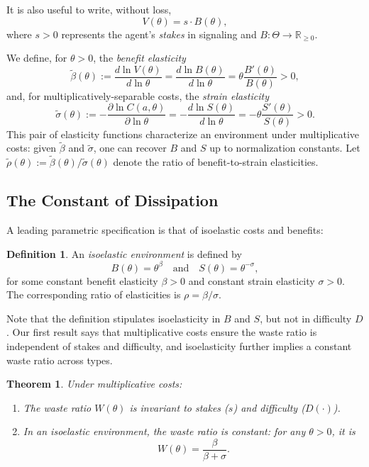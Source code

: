 \documentclass[12 pt]{article}
\newtheorem{theorem}{Theorem}
\theoremstyle{remark}
\theoremstyle{definition}
\newtheorem{definition}{Definition}
\newcommand{\R}{\mathbb{R}}
\newcommand{\Rpos}{\R_{\geq0}}
\newcommand{\elaB}{\tilde\beta}   %
\newcommand{\elaS}{\tilde\sigma}  %
\newcommand{\elaR}{\tilde\rho}    %
\begin{document}
It is also useful to write, without loss, $$V(\theta)= s\cdot B(\theta),$$ where $s>0$ represents the agent's \emph{stakes} in signaling and $B:\Theta\to \Rpos$.


We define, for $\theta>0$, the \emph{benefit elasticity}
\[
\elaB(\theta) := \frac{d\ln V(\theta)}{d\ln\theta} = \frac{d\ln B(\theta)}{d\ln\theta} = \theta\frac{B'(\theta)}{B(\theta)}>0,
\]
and, for multiplicatively-separable costs, the \emph{strain elasticity} %
\[
\elaS(\theta) := -\frac{\partial\ln C(a,\theta)}{\partial\ln\theta} = -\frac{d\ln S(\theta)}{d\ln\theta} = -\theta\frac{S'(\theta)}{S(\theta)}>0.
\]
This pair of elasticity functions characterize an environment under multiplicative costs: given $\elaB$ and $\elaS$, one can recover $B$ and $S$ up to normalization constants. 
Let $\elaR(\theta):=\elaB(\theta)/\elaS(\theta)$ denote the ratio of benefit-to-strain elasticities.


\subsection{The Constant of Dissipation}
\label{subsec:constant}

A leading parametric specification is that of isoelastic costs and benefits:

\begin{definition}
\label{def:isoelastic}
An \emph{isoelastic environment} is defined by
\[
B(\theta) = \theta^\beta \quad \text{and} \quad S(\theta) = \theta^{-\sigma},
\]
for some %
constant {benefit elasticity} $\beta > 0$ and constant {strain elasticity} $\sigma > 0$. The corresponding ratio of elasticities is $\rho = \beta / \sigma$.
\end{definition}

Note that the definition stipulates isoelasticity in $B$ and $S$, but not in difficulty $D$. Our first result says that multiplicative costs ensure the waste ratio is independent of stakes and difficulty, and isoelasticity further implies a constant waste ratio across types.


\begin{theorem}
\label{thm:constant}
Under multiplicative costs:
\begin{enumerate}
\item \label{invariance} The waste ratio $W(\theta)$ is invariant to stakes ($s$) and difficulty ($D(\cdot)$).
\item \label{constant} In an isoelastic environment, the waste ratio is constant: for any $\theta>0$, it is
\begin{equation}
\label{e:constant}
W(\theta) = \frac{\beta}{\beta + \sigma}.    
\end{equation}
\end{enumerate}
\end{theorem}
\end{document}
